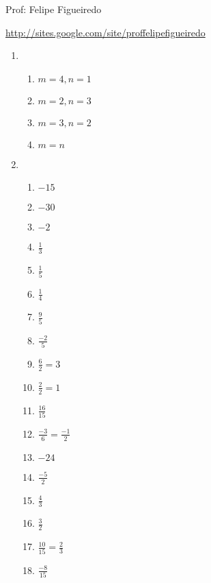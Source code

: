 \documentclass[a4paper]{article}
\begin{document}
\parbox[c]{.825\textwidth}{\raggedright%
{Prof: Felipe Figueiredo\par}
{\url{http://sites.google.com/site/proffelipefigueiredo}}

\vspace{1cm}
}


\begin{enumerate}

\section{}


\item 
  \begin{enumerate}
  \item $m=4, n=1$
  \item $m=2, n=3$
  \item $m=3, n=2$
  \item $m=n$
  \end{enumerate}


\item 
  \begin{enumerate}
  \item $-15$
  \item $-30$
  \item $-2$
  \item $\frac{1}{3}$
  \item $\frac{1}{5}$
  \item $\frac{1}{4}$
  \item $\frac{9}{5}$
  \item $\frac{-2}{5}$
  \item $\frac{6}{2}=3$
  \item $\frac{2}{2}=1$
  \item $\frac{16}{15}$
  \item $\frac{-3}{6}=\frac{-1}{2}$
  \item $-24$
  \item $\frac{-5}{2}$
  \item $\frac{4}{3}$
  \item $\frac{3}{2}$
  \item $\frac{10}{15}=\frac{2}{3}$
  \item $\frac{-8}{15}$ 
  \end{enumerate}


\end{enumerate}
\end{document}
